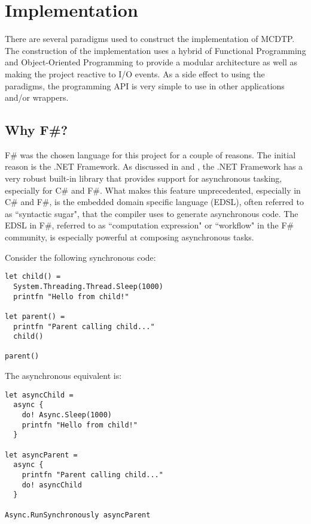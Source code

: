 \chapter{Implementation}\label{chp:impl}

There are several paradigms used to construct the implementation of MCDTP. The construction of the implementation uses a hybrid of Functional Programming and Object-Oriented Programming to provide a modular architecture as well as making the project reactive to I/O events. As a side effect to using the paradigms, the programming API is very simple to use in other applications and/or wrappers.

\section{Why F\#?}

F\# was the chosen language for this project for a couple of reasons. The initial reason is the .NET Framework. As discussed in \cite{Leijen2009} and \cite{syme2011f}, the .NET Framework has a very robust built-in library that provides support for asynchronous tasking, especially for C\# and F\#. What makes this feature unprecedented, especially in C\# and F\#, is the embedded domain specific language (EDSL), often referred to as ``syntactic sugar", that the compiler uses to generate asynchronous code. The EDSL in F\#, referred to as ``computation expression" or ``workflow" in the F\# community, is especially powerful at composing asynchronous tasks.

Consider the following synchronous code:

\begin{lstlisting}[caption=Synchronous F\# Example]
let child() =
  System.Threading.Thread.Sleep(1000)
  printfn "Hello from child!"

let parent() =
  printfn "Parent calling child..."
  child()

parent()
\end{lstlisting}

The asynchronous equivalent is:

\begin{lstlisting}[caption=Asynchronous F\# Example,label={lst:async}]
let asyncChild =
  async {
    do! Async.Sleep(1000)
    printfn "Hello from child!"
  }

let asyncParent =
  async {
    printfn "Parent calling child..."
    do! asyncChild
  }

Async.RunSynchronously asyncParent
\end{lstlisting}


